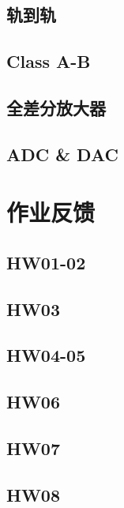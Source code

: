 \documentclass[cn,11pt,english,black,simple,device=ppt]{elegantbook}
\begin{document}
\chapter{轨到轨}



\chapter{Class A-B}

\chapter{全差分放大器}



\chapter{ADC \& DAC} 

 

\part{作业反馈}

\chapter{HW01-02}

 

\chapter{HW03}

 

\chapter{HW04-05}

 

\chapter{HW06}

 

\chapter{HW07}

 

\chapter{HW08}

 

\mainmatter
\end{document}
